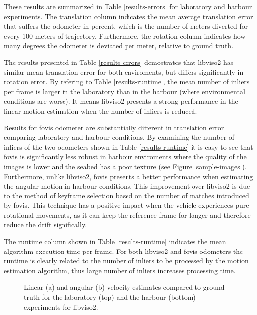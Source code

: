 \documentclass[conference]{IEEEtran}
\begin{document}
These results are summarized in Table \ref{results-errors} for laboratory and harbour experiments. The translation column indicates the mean average translation error that suffers the odometer in percent, which is the number of meters diverted for every 100 meters of trajectory. Furthermore, the rotation column indicates how many degrees the odometer is deviated per meter, relative to ground truth.

The results presented in Table \ref{results-errors} demostrates that libviso2 has similar mean translation error for both enviroments, but differs significantly in rotation error. By refering to Table \ref{results-runtime}, the mean number of inliers per frame is larger in the laboratory than in the harbour (where environmental conditions are worse). It means libviso2 presents a strong performance in the linear motion estimation when the number of inliers is reduced.

Results for fovis odometer are substantially different in translation error comparing laboratory and harbour conditions. By examining the number of inliers of the two odometers shown in Table \ref{results-runtime} it is easy to see that fovis is significantly less robust in harbour enviroments where the quality of the images is lower and the seabed has a poor texture (see Figure \ref{sample-images}). Furthermore, unlike libviso2, fovis presents a better performance when estimating the angular motion in harbour conditions. This improvement over libviso2 is due to the method of keyframe selection based on the number of matches introduced by fovis. This technique has a positive impact when the vehicle experiences pure rotational movements, as it can keep the reference frame for longer and therefore reduce the drift significally.

The runtime column shown in Table \ref{results-runtime} indicates the mean algorithm execution time per frame. For both libviso2 and fovis odometers the runtime is clearly related to the number of inliers to be processed by the motion estimation algorithm, thus large number of inliers increases processing time.

\begin{figure}
  \begin{center}
  \end{center}
  \caption{Linear (a) and angular (b) velocity estimates compared to ground truth for the laboratory (top) and the harbour (bottom) experiments for libviso2.}
  \label{error-plots-viso2}
\end{figure}
\end{document}
